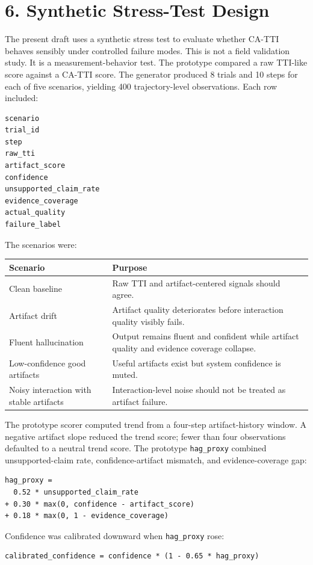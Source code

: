 \documentclass[11pt]{article}
\begin{document}
\section{6. Synthetic Stress-Test Design}
The present draft uses a synthetic stress test to evaluate whether CA-TTI behaves sensibly under controlled failure modes. This is not a field validation study. It is a measurement-behavior test.
The prototype compared a raw TTI-like score against a CA-TTI score. The generator produced 8 trials and 10 steps for each of five scenarios, yielding 400 trajectory-level observations. Each row included:
\begin{Verbatim}[fontsize=\small]
scenario
trial_id
step
raw_tti
artifact_score
confidence
unsupported_claim_rate
evidence_coverage
actual_quality
failure_label
\end{Verbatim}
The scenarios were:
\begin{center}\small
\begin{tabularx}{\linewidth}{Y|Y}
\toprule
Scenario & Purpose \\
\midrule
Clean baseline & Raw TTI and artifact-centered signals should agree. \\
Artifact drift & Artifact quality deteriorates before interaction quality visibly fails. \\
Fluent hallucination & Output remains fluent and confident while artifact quality and evidence coverage collapse. \\
Low-confidence good artifacts & Useful artifacts exist but system confidence is muted. \\
Noisy interaction with stable artifacts & Interaction-level noise should not be treated as artifact failure. \\
\bottomrule
\end{tabularx}
\end{center}
The prototype scorer computed trend from a four-step artifact-history window. A negative artifact slope reduced the trend score; fewer than four observations defaulted to a neutral trend score. The prototype \texttt{hag\_proxy} combined unsupported-claim rate, confidence-artifact mismatch, and evidence-coverage gap:
\begin{Verbatim}[fontsize=\small]
hag_proxy =
  0.52 * unsupported_claim_rate
+ 0.30 * max(0, confidence - artifact_score)
+ 0.18 * max(0, 1 - evidence_coverage)
\end{Verbatim}
Confidence was calibrated downward when \texttt{hag\_proxy} rose:
\begin{Verbatim}[fontsize=\small]
calibrated_confidence = confidence * (1 - 0.65 * hag_proxy)
\end{Verbatim}
\end{document}
